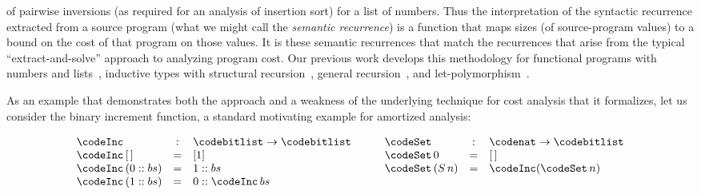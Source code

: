 of pairwise inversions (as required for an analysis of insertion sort) for a
list of numbers.  Thus the interpretation of the syntactic recurrence
extracted from a source program (what we might call the \emph{semantic
recurrence}) is a function that maps sizes (of source-program values) to a
bound on the cost of that program on those values.  
It is these semantic recurrences
that match the recurrences that arise from the typical ``extract-and-solve''
approach to analyzing program cost.  Our previous work develops this
methodology for functional programs with numbers and
lists~\cite{danner-et-al:plpv13}, inductive types with structural
recursion~\cite{danner-et-al:icfp15}, general
recursion~\cite{kavvos-et-al:popl20}, and
let-polymorphism~\cite{danner-licata:jfp-in-prep}.

As an example that demonstrates both the approach and a weakness of the
underlying technique for cost analysis that it formalizes, let us consider
the binary increment function, a standard motivating example for amortized
analysis:
\begin{small}
\[
\begin{array}[t]{lcl}
\codeInc &:& \codebitlist \to \codebitlist \\
\codeInc\,[\,] &=& [1] \\
\codeInc\,(0 :: bs) &=& 1 :: bs \\
\codeInc\,(1 :: bs) &=& 0 :: \codeInc\,bs
\end{array}
\qquad
\begin{array}[t]{lcl}
\codeSet &:& \codenat \to \codebitlist \\
\codeSet\,0 &=& [\,] \\
\codeSet\,(S\,n) &=& \codeInc(\codeSet\,n)
\end{array}
\]
\end{small}


